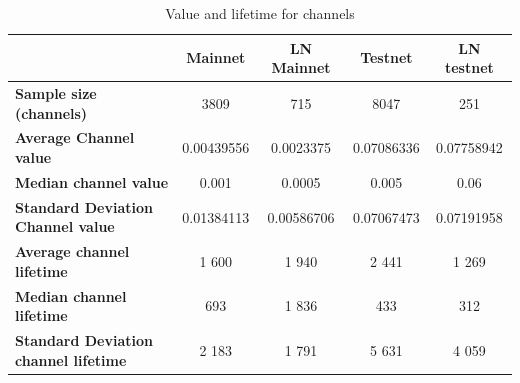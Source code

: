 \begin{table}[ht]
\centering
\caption{Value and lifetime for channels}
\label{subgraph_stats}
\begin{tabular}{l|c|c|c|c}
                                              & \textbf{Mainnet} & \textbf{LN Mainnet}& \textbf{Testnet} & \textbf{LN testnet} \\ \hline
\textbf{Sample size (channels)}              & 3809             & 715           & 8047                     & 251            \\ \hline
\textbf{Average Channel value}               & 0.00439556     & 0.0023375        & 0.07086336            & 0.07758942       \\ \hline
\textbf{Median channel value}                & 0.001         & 0.0005             & 0.005            & 0.06        \\ \hline
\textbf{Standard Deviation Channel value}    & 0.01384113       & 0.00586706      & 0.07067473            & 0.07191958        \\ \hline
\textbf{Average channel lifetime}            & 1 600            & 1 940           & 2 441                & 1 269            \\ \hline
\textbf{Median channel lifetime }             & 693              & 1 836             & 433                  & 312              \\ \hline
\textbf{Standard Deviation channel lifetime} & 2 183            & 1 791           & 5 631                & 4 059            \\ \hline
\end{tabular}
\end{table}

